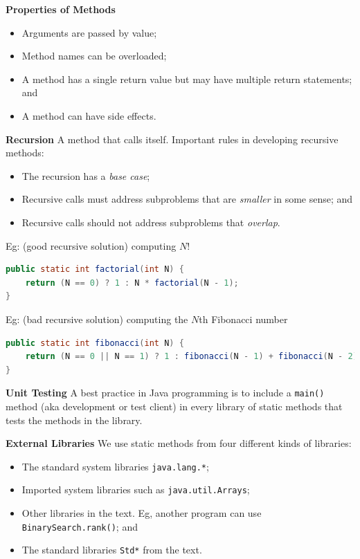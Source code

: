 \documentclass[8pt,a4paper,compress]{beamer}
\begin{document}
\begin{frame}[fragile]
\pause

\textbf{Properties of Methods}
\begin{itemize}
\item Arguments are passed by value; 
\item Method names can be overloaded; 
\item A method has a single return value but may have multiple return statements; and
\item A method can have side effects.
\end{itemize}

\pause
\smallskip

\textbf{Recursion} A method that calls itself. Important rules in developing recursive methods:
\begin{itemize}
\item The recursion has a \emph{base case}; 
\item Recursive calls must address subproblems that are \emph{smaller} in some sense; and
\item Recursive calls should not address subproblems that \emph{overlap}.
\end{itemize}

\pause

Eg: (good recursive solution) computing $N!$

\begin{lstlisting}[language=Java]
public static int factorial(int N) {
    return (N == 0) ? 1 : N * factorial(N - 1); 
}
\end{lstlisting}

\pause

Eg: (bad recursive solution) computing the $N$th Fibonacci number
\begin{lstlisting}[language=Java]
public static int fibonacci(int N) {
    return (N == 0 || N == 1) ? 1 : fibonacci(N - 1) + fibonacci(N - 2); 
}
\end{lstlisting}

\pause
\smallskip

\textbf{Unit Testing} A best practice in Java programming is to include a \lstinline$main()$ method (aka development or test client) in every library of static methods that tests the methods in the library.

\end{frame}

\begin{frame}[fragile]
\pause
\textbf{External Libraries} We use static methods from four different kinds of libraries:
\begin{itemize}
\item The standard system libraries \lstinline$java.lang.*$; 
\item Imported system libraries such as \lstinline$java.util.Arrays$; 
\item Other libraries in the text. Eg, another program can use \lstinline$BinarySearch.rank()$; and
\item The standard libraries \lstinline$Std*$ from the text.
\end{itemize}
\end{frame}
\end{document}
